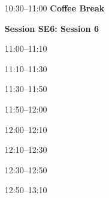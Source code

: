 \begin{itemize}
\vspace{1ex}
\item[10:30--11:00] {\bfseries  Coffee Break}

\vspace{1ex}
\item[] {\bfseries Session SE6: Session 6}
\item[11:00--11:10] 
\item[11:10--11:30] 
\item[11:30--11:50] 
\item[11:50--12:00] 
\item[12:00--12:10] 
\item[12:10--12:30] 
\item[12:30--12:50] 
\item[12:50--13:10] 


\end{itemize}
